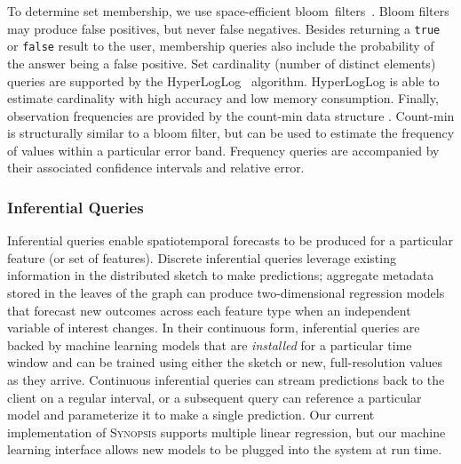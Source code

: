 To determine set membership, we use space-efficient bloom~filters~\cite{bloom1970space}. Bloom filters may produce false positives, but never false negatives. Besides returning a \texttt{true} or \texttt{false} result to the user, membership queries also include the probability of the answer being a false positive.  Set cardinality (number of distinct elements) queries are supported by the HyperLogLog~\cite{flajolet2007hyperloglog} algorithm. HyperLogLog is able to estimate cardinality with high accuracy and low memory consumption. Finally, observation frequencies are provided by the count-min data structure \cite{cormode2005improved}. Count-min is structurally similar to a bloom filter, but can be used to estimate the frequency of values within a particular error band. Frequency queries are accompanied by their associated confidence intervals and relative error.

\subsubsection{Inferential Queries}
Inferential queries enable spatiotemporal forecasts to be produced for a particular feature (or set of features). Discrete inferential queries leverage existing information in the distributed sketch to make predictions; aggregate metadata stored in the leaves of the graph can produce two-dimensional regression models that forecast new outcomes across each feature type when an independent variable of interest changes. In their continuous form, inferential queries are backed by machine learning models that are \emph{installed} for a particular time window and can be trained using either the sketch or new, full-resolution values as they arrive. Continuous inferential queries can stream predictions back to the client on a regular interval, or a subsequent query can reference a particular model and parameterize it to make a single prediction. Our current implementation of \textsc{Synopsis} supports multiple linear regression, but our machine learning interface allows new models to be plugged into the system at run time.
